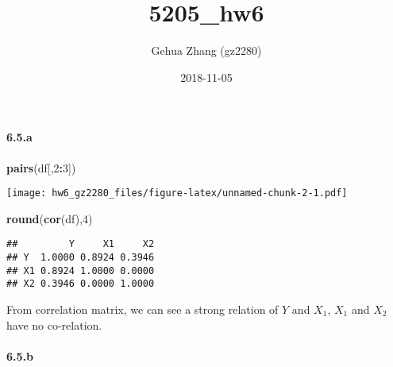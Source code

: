 \documentclass[]{article}
\title{5205\_hw6}
\author{Gehua Zhang (gz2280)}
\date{2018-11-05}
\newenvironment{Shaded}{\begin{snugshade}}{\end{snugshade}}
\newcommand{\DataTypeTok}[1]{\textcolor[rgb]{0.13,0.29,0.53}{#1}}
\newcommand{\DecValTok}[1]{\textcolor[rgb]{0.00,0.00,0.81}{#1}}
\newcommand{\KeywordTok}[1]{\textcolor[rgb]{0.13,0.29,0.53}{\textbf{#1}}}
\newcommand{\NormalTok}[1]{#1}
\newcommand{\OperatorTok}[1]{\textcolor[rgb]{0.81,0.36,0.00}{\textbf{#1}}}
\newcommand{\StringTok}[1]{\textcolor[rgb]{0.31,0.60,0.02}{#1}}
\let\oldparagraph\paragraph
\renewcommand{\paragraph}[1]{\oldparagraph{#1}\mbox{}}
\begin{document}
\maketitle

\hypertarget{a}{%
\paragraph{6.5.a}\label{a}}

\begin{Shaded}
\end{Shaded}

\begin{Shaded}
\begin{Highlighting}[]
\KeywordTok{pairs}\NormalTok{(df[,}\DecValTok{2}\OperatorTok{:}\DecValTok{3}\NormalTok{])}
\end{Highlighting}
\end{Shaded}

\texttt{[image: hw6\_gz2280\_files/figure-latex/unnamed-chunk-2-1.pdf]}

\begin{Shaded}
\begin{Highlighting}[]
\KeywordTok{round}\NormalTok{(}\KeywordTok{cor}\NormalTok{(df),}\DecValTok{4}\NormalTok{)}
\end{Highlighting}
\end{Shaded}

\begin{verbatim}
##         Y     X1     X2
## Y  1.0000 0.8924 0.3946
## X1 0.8924 1.0000 0.0000
## X2 0.3946 0.0000 1.0000
\end{verbatim}

From correlation matrix, we can see a strong relation of \(Y\) and
\(X_1\), \(X_1\) and \(X_2\) have no co-relation.

\hypertarget{b}{%
\paragraph{6.5.b}\label{b}}
\end{document}
